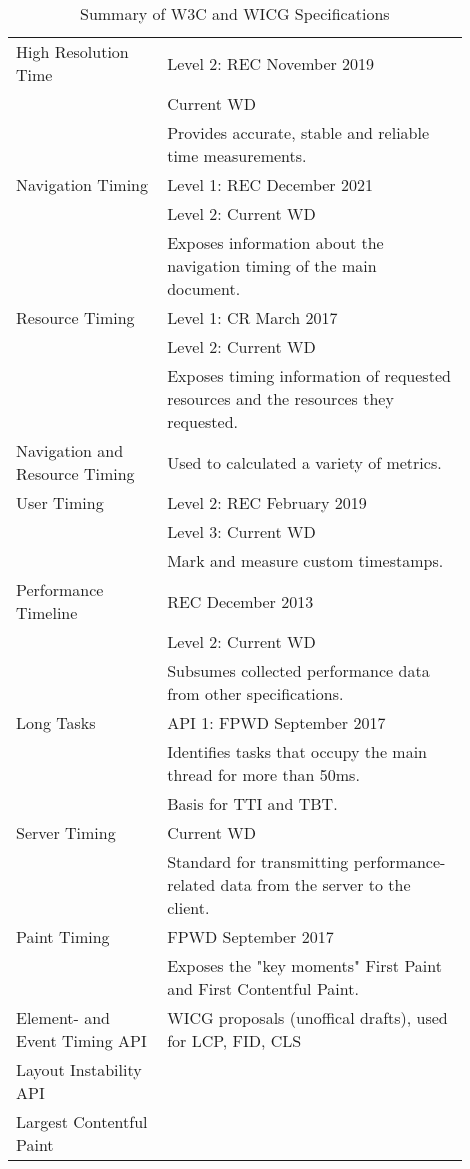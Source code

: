 \begin{table}[h]
	\small
	\centering
	\begin{tabular}{ | p{0.3\linewidth} | p{0.6\linewidth} | }
	\hline
	High Resolution Time
	& Level 2: REC November 2019 \\
	& Current WD \\
	& Provides accurate, stable and reliable time measurements. \\
	\hline
	Navigation Timing
	& Level 1: REC December 2021 \\
	& Level 2: Current WD \\
	& Exposes information about the navigation timing of the main document. \\
	\hline
	Resource Timing
	& Level 1: CR March 2017 \\
	& Level 2: Current WD \\
	& Exposes timing information of requested resources and the resources they requested. \\
	\hline
	Navigation and Resource Timing
	& Used to calculated a variety of metrics. \\
	\hline
	User Timing
	& Level 2: REC February 2019 \\
	& Level 3: Current WD \\
	& Mark and measure custom timestamps. \\
	\hline
	Performance Timeline
	& REC December 2013 \\
	& Level 2: Current WD \\
	& Subsumes collected performance data from other specifications. \\
	\hline
	Long Tasks
	& API 1: FPWD  September 2017 \\
	& Identifies tasks that occupy the main thread for more than 50ms. \\
	& Basis for TTI and TBT. \\
	\hline
	Server Timing
	& Current WD \\
	& Standard for transmitting performance-related data from the server to the client. \\
	\hline
	Paint Timing
	& FPWD September 2017 \\
	& Exposes the "key moments" First Paint and First Contentful Paint. \\
	\hline
	Element- and Event Timing API & WICG proposals (unoffical drafts), used for LCP, FID, CLS  \\
	Layout Instability API & \\ %
	Largest Contentful Paint & \\
	\hline
	\end{tabular}
	\medskip
	\caption{Summary of W3C and WICG Specifications}
	\label{table:apis_summary}
\end{table}


